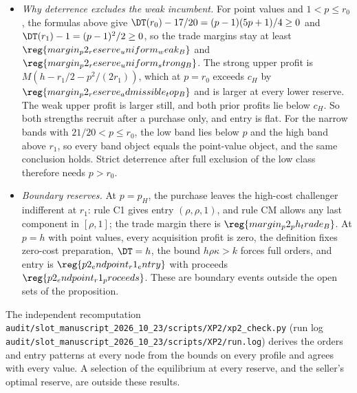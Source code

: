 \begin{itemize}[leftmargin=2em]
\(\reg{margin_p2_reserve_points_rev1_B}\). The point values and the narrow bands give the same objects here, because the
reserve lies above the low band and below the high band. The strong upper profit equals \(c_H\) at
\(p_H=\sqrt{2r_1(h-c_H/M)-r_1^2}\approx\reg{p2_reserve_ph}\), and the weak upper profit equals \(c_H\) at
\(h-c_H/M\approx\reg{p2_reserve_weak_top}\); the reserve lies inside this interval, at distances
\(\reg{margin_p2_deter_lower_B}\) and \(\reg{margin_p2_deter_upper_B}\) from its ends, and \(p_H-r_0=\reg{margin_p2_ph_weak_B}\).
\item \emph{Why deterrence excludes the weak incumbent.} For point values and \(1<p\le r_0\), the formulas above give
\(\DT(r_0)-17/20=(p-1)(5p+1)/4\ge0\) and \(\DT(r_1)-1=(p-1)^2/2\ge0\), so the trade margins stay at least
\(\reg{margin_p2_reserve_uniform_weak_B}\) and \(\reg{margin_p2_reserve_uniform_strong_B}\). The strong upper profit is
\(M(h-r_1/2-p^2/(2r_1))\), which at \(p=r_0\) exceeds \(c_H\) by \(\reg{margin_p2_reserve_admissible_top_B}\) and is larger
at every lower reserve. The weak upper profit is larger still, and both prior profits lie below \(c_H\). So both
strengths recruit after a purchase only, and entry is flat. For the narrow bands with
\(21/20<p\le r_0\), the low band lies below \(p\) and the high band above \(r_1\), so every band object equals the
point-value object, and the same conclusion holds. Strict deterrence after full exclusion of the low class therefore
needs \(p>r_0\).
\item \emph{Boundary reserves.} At \(p=p_H\), the purchase leaves the high-cost challenger indifferent at \(r_1\):
rule C1 gives entry \((\rho,\rho,1)\), and rule CM allows any last component in \([\rho,1]\); the trade margin there is
\(\reg{margin_p2_ph_trade_B}\). At \(p=h\) with point values, every acquisition profit is zero, the definition fixes
zero-cost preparation, \(\DT=h\), the bound \(h\rho\kappa>k\) forces full orders, and entry is
\(\reg{p2_endpoint_r1_entry}\) with proceeds \(\reg{p2_endpoint_r1_proceeds}\). These are boundary events outside the
open sets of the proposition.
\end{itemize}
The independent recomputation \nolinkurl{audit/slot_manuscript_2026_10_23/scripts/XP2/xp2_check.py} (run log
\nolinkurl{audit/slot_manuscript_2026_10_23/scripts/XP2/run.log}) derives the orders and entry patterns at every node
from the bounds on every profile and agrees with every value. A selection of the equilibrium at every reserve, and the
seller's optimal reserve, are outside these results.
